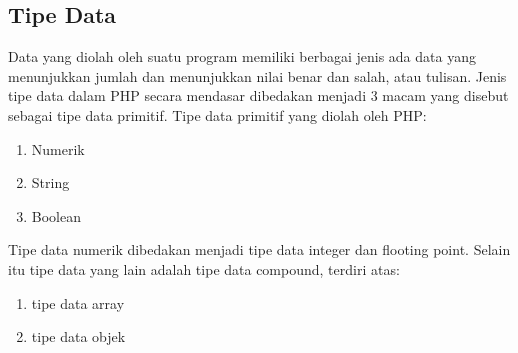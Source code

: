 \subsection{Tipe Data}
Data yang diolah oleh suatu program memiliki berbagai jenis ada data yang menunjukkan jumlah dan menunjukkan nilai benar dan salah, atau tulisan. Jenis tipe data dalam PHP secara mendasar dibedakan menjadi 3 macam yang disebut sebagai tipe data primitif. Tipe data primitif yang diolah oleh PHP:
\begin{enumerate}
\item Numerik
\item String
\item Boolean
\end{enumerate}
Tipe data numerik dibedakan menjadi tipe data integer dan flooting point. Selain itu tipe data yang lain adalah tipe data compound, terdiri atas:
\begin{enumerate}
\item tipe data array
\item tipe data objek 
\end{enumerate}
